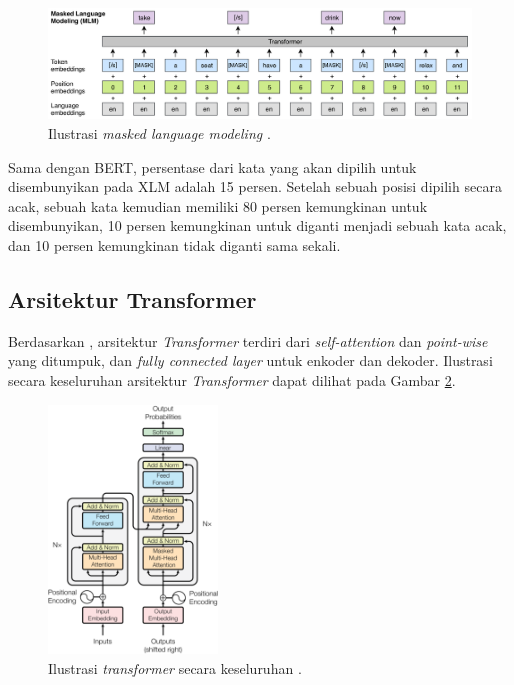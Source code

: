     \begin{figure}[ht]
        \centering
        \includegraphics[width=1\textwidth]{resources/ilustrasi-mlm.png}
        \caption{Ilustrasi \textit{masked language modeling} \parencite{LampleConneau2019}.}
        \label{fig:ilustrasi_mlm}
    \end{figure}

    Sama dengan BERT, persentase dari kata yang akan dipilih untuk disembunyikan pada XLM adalah 15 persen. Setelah sebuah posisi dipilih secara acak, sebuah kata kemudian memiliki 80 persen kemungkinan untuk disembunyikan, 10 persen kemungkinan untuk diganti menjadi sebuah kata acak, dan 10 persen kemungkinan tidak diganti sama sekali.

    \subsection{Arsitektur Transformer}

    Berdasarkan \parencite{AttentionVaswani2017}, arsitektur \textit{Transformer} terdiri dari \textit{self-attention} dan \textit{point-wise} yang ditumpuk, dan \textit{fully connected layer} untuk enkoder dan dekoder. Ilustrasi secara keseluruhan arsitektur \textit{Transformer} dapat dilihat pada Gambar \ref{fig:ilustrasi_transformer}.

    \begin{figure}[ht]
        \centering
        \includegraphics[width=0.4\textwidth]{resources/overview-transformer.png}
        \caption{Ilustrasi \textit{transformer} secara keseluruhan \parencite{AttentionVaswani2017}.}
        \label{fig:ilustrasi_transformer}
    \end{figure}

